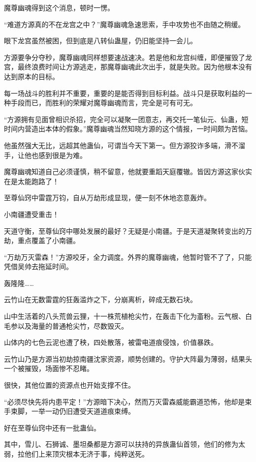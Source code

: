 \begin{this_body}
魔尊幽魂得到这个消息，顿时一愣。

“难道方源真的不在龙宫之中？”魔尊幽魂急速思索，手中攻势也不由随之稍缓。

眼下龙宫虽然被困，但到底是八转仙蛊屋，仍旧能坚持一会儿。

方源要争分夺秒，魔尊幽魂同样想要速战速决。若是他和龙宫纠缠，即便摧毁了龙宫，最终浪费时间让方源逃走，那魔尊幽魂此次出手，就是失败。因为他根本没有达到原本的目标。

每一场战斗的胜利并不重要，重要的是能否得到目标利益。战斗只是获取利益的一种手段而已，而胜利的荣耀对魔尊幽魂而言，完全是可有可无。

“方源拥有见面曾相识杀招，完全可以凝聚一团意志，再交托一笔仙元、仙蛊，短时间内营造出本体的假象。”魔尊幽魂当然知晓方源的这个情报，一时间颇为苦恼。

他虽然强大无比，远超其他蛊仙，可谓当今天下第一。但方源狡诈多端，滑不溜手，让他也感到很是为难。

魔尊幽魂知道自己必须谨慎，稍不留意，他就要重蹈天庭覆辙。皆因方源这家伙实在是太能跑路了！

至尊仙窍中雷霆万钧，自从万劫形成显现，便一刻不休地恣意轰炸。

小南疆遭受重击！

天道守衡，至尊仙窍中哪处发展的最好？无疑是小南疆。于是天道凝聚转变出的万劫，重点覆盖了小南疆。

“万劫万灭雷森！”方源咬牙，全力调度。外界的魔尊幽魂，他暂时管不了了，只能凭借吴帅去拖延时间。

轰隆隆……

云竹山在无数雷霆的狂轰滥炸之下，分崩离析，碎成无数石块。

山中生活着的八头荒兽云狸，十一株荒植枪尖竹，在轰击下化为齑粉。云气根、白毛参以及海量的普通枪尖竹，尽数毁灭。

山体内的七色云泥也遭了秧，四处散落，被雷电道痕侵蚀，价值暴跌。

云竹山乃是方源当初劫掠南疆沈家资源，顺势创建的。守护大阵最为薄弱，结果头一个被摧毁，场面惨不忍睹。

很快，其他位置的资源点也开始支撑不住。

“必须尽快先将内患平定！”方源暗下决心，然而万灭雷森威能霸道恐怖，他却是束手束脚，一举一动仍旧遭受天道道痕束缚。

好在至尊仙窍中还有一批蛊仙。

其中，雪儿、石狮诚、墨坦桑都是方源可以扶持的异族蛊仙首领，他们的修为太弱，拉他们上来顶灾根本无济于事，纯粹送死。


\end{this_body}
